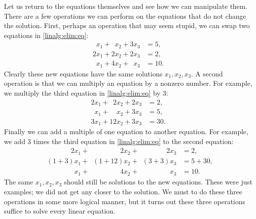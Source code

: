 \documentclass{ximera}
\begin{document}
Let us return to the equations themselves and see how we can manipulate them. There are a few operations we can perform on the equations that do not change the solution.  First, perhaps an operation that may seem stupid, we can swap  two equations in \eqref{linalg:elim:eq}:
\begin{equation*}
    \begin{aligned}
        \phantom{9} x_1 + \phantom{9} x_2 +           3 x_3 & = 5 , \\
                  2 x_1 +           2 x_2 +           2 x_3 & = 2 , \\
        \phantom{9} x_1 +           4 x_2 + \phantom{9} x_3 & = 10 .
    \end{aligned}
\end{equation*}
Clearly these new equations have the same solutions $x_1,x_2,x_3$. A second operation is that we can multiply an equation by a nonzero number.  For example, we multiply the third equation in \eqref{linalg:elim:eq} by 3:
\begin{equation*}
    \begin{aligned}
                  2 x_1 + \phantom{9}  2 x_2 + 2 x_3 & = 2 , \\
        \phantom{9} x_1 + \phantom{99}   x_2 + 3 x_3 & = 5 , \\
                  3 x_1 +             12 x_2 + 3 x_3 & = 30 .
    \end{aligned}
\end{equation*}
Finally we can add a multiple of one equation to another equation. For example, we add 3 times the third equation in \eqref{linalg:elim:eq} to the second equation:
\begin{equation*}
    \begin{aligned}
        \phantom{(1+3)} 2 x_1 + \phantom{(1+12)}  2 x_2 + \phantom{(3+3)} 2 x_3 & = 2 , \\
        \phantom{2} (1+3) x_1 + \phantom{2}(1+12)   x_2 + \phantom{2} (3+3) x_3 & = 5+30 , \\
        \phantom{2 (1+3)} x_1 + \phantom{(1+12)}  4 x_2 + \phantom{(3+3) 2} x_3 & = 10 .
    \end{aligned}
\end{equation*}
The same $x_1,x_2,x_3$ should still be solutions to the new equations. These were just examples; we did not get any closer to the solution. We must to do these three operations in some more logical manner, but it turns out these three operations suffice to solve every linear equation.
\end{document}
